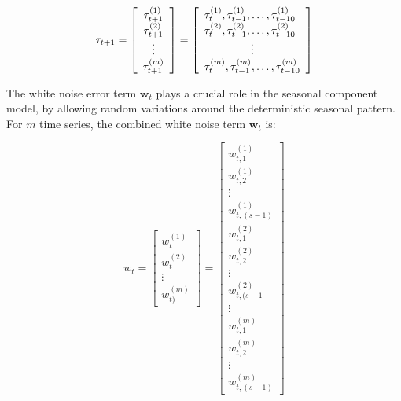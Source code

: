     \begin{equation}
        \tau_{t+1}=
            \left[
                \begin{array}{c}
                    \tau_{t+1}^{(1)} \\
                    \tau_{t+1}^{(2)} \\
                    \hfill \vdots \hfill \\
                    \tau_{t+1}^{(m)}
                \end{array}\right]
            =\left[
                \begin{array}{l}
                    \tau_t^{(1)}, \tau_{t-1}^{(1)}, \ldots, \tau_{t-10}^{(1)} \\
                    \tau_t^{(2)}, \tau_{t-1}^{(2)}, \ldots, \tau_{t-10}^{(2)} \\
                    \hfill \vdots \hfill \\
                    \tau_t^{(m)}, \tau_{t-1}^{(m)}, \ldots, \tau_{t-10}^{(m)}
                \end{array}
            \right]
        \label{eq:seasonal_state}
    \end{equation}

    The white noise error term $\bm{w}_{t}$ plays a crucial role in the seasonal component model,
    by allowing random variations around the deterministic seasonal pattern.
    For $m$ time series, the combined white noise term $\bm{w}_{t}$ is:

    \begin{equation}
        w_t=
            \left[
                \begin{array}{c}
                    w_{t}^{(1)} \\
                    w_{t}^{(2)} \\
                    \vdots \\
                    w_{t)}^{(m)}
                \end{array}
            \right]
           =
            \left[
                \begin{array}{c}
                    w_{t, 1}^{(1)} \\
                    w_{t, 2}^{(1)} \\
                    \vdots \\
                    w_{t, (s-1)}^{(1)} \\
                    w_{t, 1}^{(2)} \\
                    w_{t, 2}^{(2)} \\
                    \vdots \\
                    w_{t, (s-1}^{(2)} \\
                    \vdots \\
                    w_{t, 1}^{(m)} \\
                    w_{t, 2}^{(m)} \\
                    \vdots \\
                    w_{t, (s-1)}^{(m)}
                \end{array}
            \right]
    \label{eq:seasonal_error}
    \end{equation}

